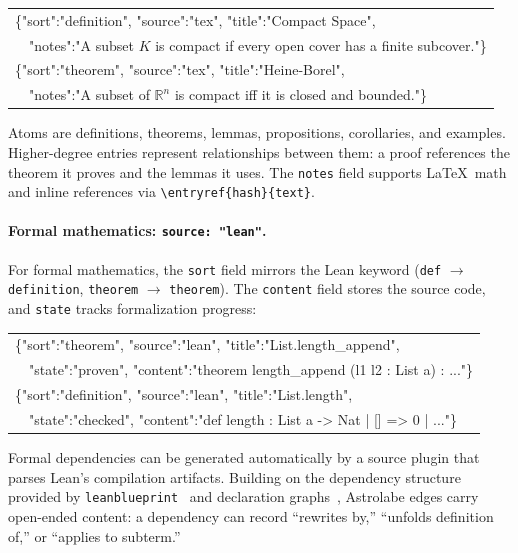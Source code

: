 \medskip
{\scriptsize\ttfamily
\begin{tabular}{@{}l@{}}
\{"sort":"definition", "source":"tex", "title":"Compact Space",\\
\ \ "notes":"A subset $K$ is compact if every open cover has a finite subcover."\}\\[4pt]
\{"sort":"theorem", "source":"tex", "title":"Heine-Borel",\\
\ \ "notes":"A subset of $\mathbb{R}^n$ is compact iff it is closed and bounded."\}
\end{tabular}
}
\medskip

Atoms are definitions, theorems, lemmas, propositions, corollaries, and examples. Higher-degree entries represent relationships between them: a proof references the theorem it proves and the lemmas it uses. The \texttt{notes} field supports \LaTeX\ math and inline references via \verb|\entryref{hash}{text}|.

\paragraph{Formal mathematics: \texttt{source: "lean"}.}

For formal mathematics, the \texttt{sort} field mirrors the Lean keyword (\texttt{def} $\to$ \texttt{definition}, \texttt{theorem} $\to$ \texttt{theorem}). The \texttt{content} field stores the source code, and \texttt{state} tracks formalization progress:

\medskip
{\scriptsize\ttfamily
\begin{tabular}{@{}l@{}}
\{"sort":"theorem", "source":"lean", "title":"List.length\_append",\\
\ \ "state":"proven", "content":"theorem length\_append (l1 l2 : List a) : ..."\}\\[4pt]
\{"sort":"definition", "source":"lean", "title":"List.length",\\
\ \ "state":"checked", "content":"def length : List a -> Nat | [] => 0 | ..."\}
\end{tabular}
}
\medskip

Formal dependencies can be generated automatically by a source plugin that parses Lean's compilation artifacts. Building on the dependency structure provided by \texttt{leanblueprint}~\cite{Massot2020} and declaration graphs~\cite{LiPengSeverini2026}, Astrolabe edges carry open-ended content: a dependency can record ``rewrites by,'' ``unfolds definition of,'' or ``applies to subterm.''

